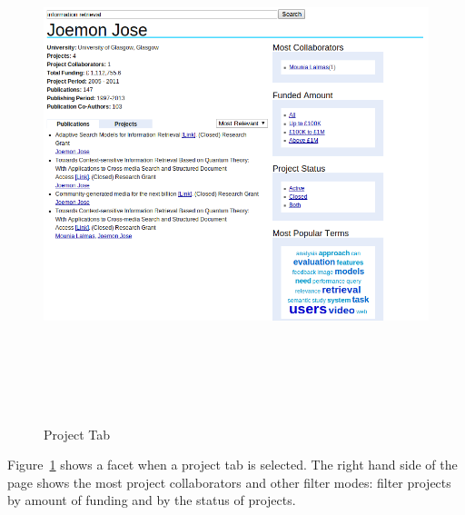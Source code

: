  \begin{figure}
 \centering
 \includegraphics[width=13cm,height=15cm,keepaspectratio]{./figures/newPofilePageProject.png}
 \caption{Project Tab} \label{fig:newPofilePageProject} 
 \end{figure}
 Figure~\ref{fig:newPofilePageProject} shows a facet when a project tab is selected. The right hand side of the page shows the most project collaborators
 and other filter modes: filter projects by amount of funding and by the status of projects.
 
